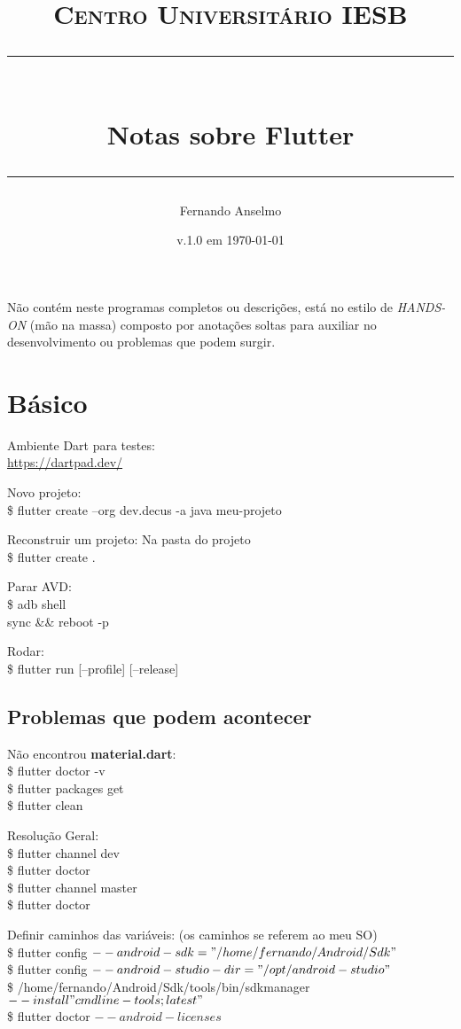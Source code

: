 \documentclass[11pt]{scrartcl}
\title{	
 \normalfont\normalsize
 \textsc{Centro Universitário IESB}\\
 \vspace{5pt} %
 \rule{\linewidth}{0.5pt}\\
 \vspace{20pt} %
 {\huge Notas sobre Flutter}\\
 \vspace{12pt} %
 \rule{\linewidth}{2pt}
}
\author{\LARGE Fernando Anselmo}
\date{v.1.0 em \normalsize\today}
\begin{document}
\maketitle

Não contém neste programas completos ou descrições, está no estilo de \textit{HANDS-ON} (mão na massa) composto por anotações soltas para auxiliar no desenvolvimento ou problemas que podem surgir.

\section{Básico}

Ambiente Dart para testes: \\
\url{https://dartpad.dev/}

Novo projeto: \\
{\ttfamily\$ flutter create --org dev.decus -a java meu-projeto}

Reconstruir um projeto: Na pasta do projeto
\\
{\ttfamily\$ flutter create .}

Parar AVD:
\\
{\ttfamily\$ adb shell
\\
sync \&\& reboot -p}

Rodar:
\\
{\ttfamily\$ flutter run [--profile] [--release]}

\subsection{Problemas que podem acontecer}

Não encontrou \textbf{material.dart}: \\
{\ttfamily\$ flutter doctor -v} \\
{\ttfamily\$ flutter packages get} \\
{\ttfamily\$ flutter clean}

Resolução Geral:
\\
{\ttfamily\$ flutter channel dev} \\
{\ttfamily\$ flutter doctor} \\
{\ttfamily\$ flutter channel master} \\
{\ttfamily\$ flutter doctor}

Definir caminhos das variáveis: (os caminhos se referem ao meu SO) \\
{\ttfamily\$ flutter config $--android-sdk="/home/fernando/Android/Sdk"$} \\
{\ttfamily\$ flutter config $--android-studio-dir="/opt/android-studio"$} \\
{\ttfamily\$ /home/fernando/Android/Sdk/tools/bin/sdkmanager $--install "cmdline-tools;latest"$} \\
{\ttfamily\$ flutter doctor $--android-licenses$}
\end{document}
